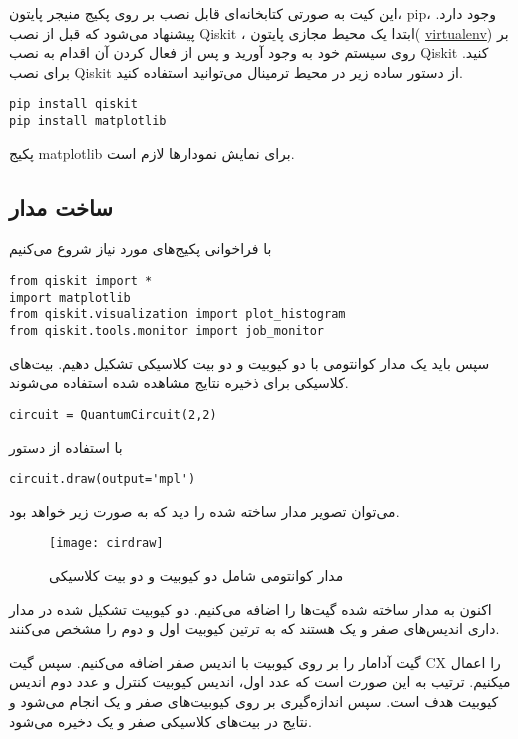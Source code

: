 \documentclass[a4paper,11pt,oneside,openany]{iut-thesis}
\begin{document}
این کیت به صورتی کتابخانه‌ای قابل نصب بر روی پکیج منیجر پایتون، pip، وجود دارد. پیشنهاد می‌شود که قبل از نصب Qiskit ، ابتدا یک محیط مجازی پایتون( \href{ https://pypi.org/project/virtualenv/}{virtualenv}) بر روی سیستم خود به وجود آورید و پس از فعال کردن آن اقدام به نصب Qiskit کنید. برای نصب Qiskit از دستور ساده زیر در محیط ترمینال می‌توانید استفاده کنید. 


\begin{latin}
\begin{lstlisting}[style=Mybash]
pip install qiskit
pip install matplotlib
\end{lstlisting}
\end{latin}
پکیج matplotlib برای نمایش نمودارها لازم است.
\subsection{
ساخت مدار
}
با فراخوانی پکیج‌های مورد نیاز شروع می‌کنیم
\begin{latin}
\begin{lstlisting}[style=Mypython]
from qiskit import * 
import matplotlib
from qiskit.visualization import plot_histogram
from qiskit.tools.monitor import job_monitor
\end{lstlisting}
\end{latin}
سپس باید یک مدار کوانتومی با دو کیوبیت و دو بیت کلاسیکی تشکیل دهیم. بیت‌های کلاسیکی برای ذخیره نتایج مشاهده شده استفاده می‌شوند.
\begin{latin}
\begin{lstlisting}[style=Mypython]
circuit = QuantumCircuit(2,2)
\end{lstlisting}
\end{latin}
با استفاده از دستور 
\begin{latin}
\begin{lstlisting}[style=Mypython]
circuit.draw(output='mpl')
\end{lstlisting}
\end{latin}
می‌توان تصویر مدار ساخته شده را دید که به صورت زیر خواهد بود.
\begin{figure}[h]
	\centering
	\texttt{[image: cirdraw]}
	\caption{
	مدار کوانتومی شامل دو کیوبیت و دو بیت کلاسیکی 
	}
	\label{cirdraw}
\end{figure} 


اکنون به مدار ساخته شده گیت‌ها را اضافه می‌کنیم. دو کیوبیت تشکیل شده در مدار داری اندیس‌های صفر و یک هستند که به ترتین کیوبیت اول و دوم را مشخص می‌کنند.

گیت آدامار را بر روی کیوبیت با اندیس صفر اضافه می‌کنیم. سپس گیت CX را اعمال میکنیم. ترتیب به این صورت است که عدد اول، اندیس کیوبیت کنترل و عدد دوم اندیس کیوبیت هدف است. سپس اندازه‌گیری بر روی کیوبیت‌های صفر و یک انجام  می‌شود و نتایج در بیت‌های کلاسیکی صفر و یک دخیره می‌شود.
\end{document}
